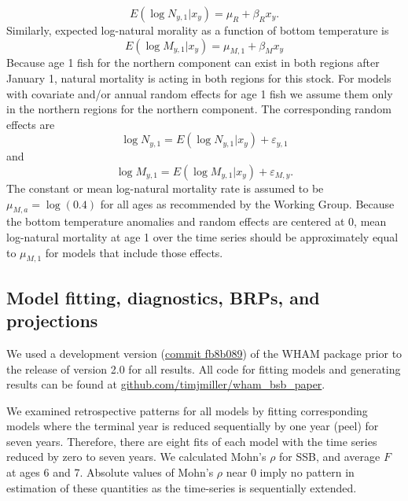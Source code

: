 \documentclass[
]{article}
\begin{document}
\begin{equation}\label{eq:expected-recruitment}
E\left(\log N_{y,1}|x_y\right) = \mu_{R} + \beta_{R} x_y.
\end{equation} Similarly, expected log-natural morality as a function of
bottom temperature is \begin{equation}\label{eq:expected-M1}
E\left(\log M_{y,1}|x_y\right) = \mu_{M,1} + \beta_{M} x_y
\end{equation} Because age 1 fish for the northern component can exist
in both regions after January 1, natural mortality is acting in both
regions for this stock. For models with covariate and/or annual random
effects for age 1 fish we assume them only in the northern regions for
the northern component. The corresponding random effects are
\begin{equation}\label{eq:Rec-re}
\log N_{y,1} = E\left(\log N_{y,1}|x_y\right) + \varepsilon_{y,1}
\end{equation} and \begin{equation}\label{eq:M-re}
\log M_{y,1} = E\left(\log M_{y,1}|x_y\right) + \varepsilon_{M,y}.
\end{equation} The constant or mean log-natural mortality rate is
assumed to be \(\mu_{M,a} = \log(0.4)\) for all ages as recommended by
the Working Group. Because the bottom temperature anomalies and random
effects are centered at 0, mean log-natural mortality at age 1 over the
time series should be approximately equal to \(\mu_{M,1}\) for models
that include those effects.

\hypertarget{model-fitting-diagnostics-brps-and-projections}{%
\subsection*{Model fitting, diagnostics, BRPs, and
projections}\label{model-fitting-diagnostics-brps-and-projections}}

We used a development version
(\href{https://github.com/timjmiller/wham/tree/fb8b089}{commit fb8b089})
of the WHAM package prior to the release of version 2.0 for all results.
All code for fitting models and generating results can be found at
\href{https://github.com/timjmiller/wham_bsb_paper}{github.com/timjmiller/wham\_bsb\_paper}.

We examined retrospective patterns for all models by fitting
corresponding models where the terminal year is reduced sequentially by
one year (peel) for seven years. Therefore, there are eight fits of each
model with the time series reduced by zero to seven years. We calculated
Mohn's \(\rho\) for SSB, and average \(F\) at ages 6 and 7. Absolute
values of Mohn's \(\rho\) near 0 imply no pattern in estimation of these
quantities as the time-series is sequentially extended.
\end{document}
